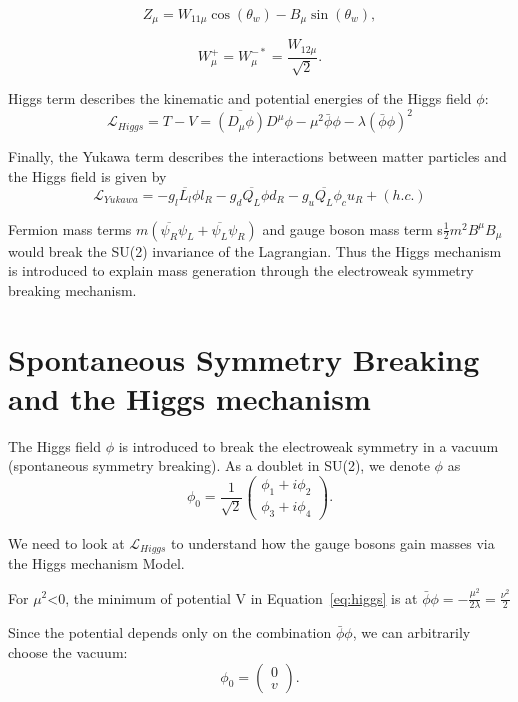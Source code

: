 \begin{equation*}
 Z_\mu=W_{11\mu}\cos\left(\theta_w\right)-B_\mu\sin\left(\theta_w\right),
\end{equation*}


\begin{equation*}
 W_\mu^+=W_\mu^{-*}=\frac{W_{12\mu}}{\sqrt{2}}.
\end{equation*}


\par Higgs term describes the kinematic and potential energies of the Higgs field $\phi$:
\begin{equation}
 \mathcal{L}_{Higgs}= T-V =\overline{\left(D_\mu\phi\right)}D^\mu\phi-\mu^2\bar{\phi}\phi-\lambda(\bar{\phi}\phi)^2
 \label{eq:higgs}
\end{equation}


Finally, the Yukawa term describes the interactions between matter particles and the Higgs field is given by
\begin{equation}
 \mathcal{L}_{Yukawa} = - g_l \overline{L_l}\phi l_R - g_d\overline{Q_L}\phi d_R - g_u\overline{Q_L}\phi_c u_R + (h.c.)
 \label{eq:yukawa}
\end{equation}
\par Fermion mass terms $m(\overline{\psi_R}\psi_L+\overline{\psi_L}\psi_R)$ and gauge boson mass term s$\frac{1}{2}m^2 B^\mu B_\mu$ would break the SU(2) invariance of the Lagrangian. Thus the Higgs mechanism is introduced to explain mass generation through the electroweak symmetry breaking mechanism.


\section{Spontaneous Symmetry Breaking and the Higgs mechanism}
\par The Higgs field $\phi$ is introduced to break the electroweak symmetry in a vacuum (spontaneous symmetry breaking).
As a doublet in SU(2), we denote $\phi$ as
\begin{equation}
 \phi_0=\frac{1}{\sqrt{2}}\left( \begin{smallmatrix} \phi_1+i\phi_2\\ \phi_3+i\phi_4 \end{smallmatrix}\right).
 \label{eq:higgsfield}
\end{equation}


\par We need to look at $ \mathcal{L}_{Higgs}$ to understand how the gauge bosons gain masses via the Higgs mechanism Model.\\
\par For $\mu^2$<$0$, the minimum of potential V in Equation~\ref{eq:higgs} is at $\bar{\phi}\phi=-\frac{\mu^2}{2\lambda}=\frac{\nu^2}{2}$
\par Since the potential depends only on the combination $\bar{\phi}\phi$, we can arbitrarily choose the vacuum:
\begin{equation}
 \phi_0=\left( \begin{smallmatrix} 0\\v \end{smallmatrix}\right).
\end{equation}


